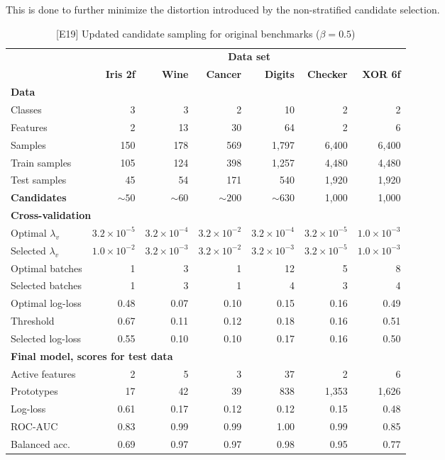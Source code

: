 This is done to further minimize the distortion introduced by the non-stratified candidate selection.\par
%
\begin{table}
\caption{[E19] Updated candidate sampling for original benchmarks ($\beta=0.5$)}
\label{tab_e19}
%
\begin{center}
\small
\begin{tabular}{|lrrrrrr|}
\hline
&\multicolumn{6}{c|}{\textbf{\hrulefill\ Data set \hrulefill}}\\
&\textbf{Iris 2f}&\textbf{Wine}&\textbf{Cancer}&\textbf{Digits}&\textbf{Checker}&\textbf{XOR 6f}\\
\multicolumn{7}{|l|}{\textbf{Data}}\\
Classes&3&3&2&10&2&2\\
Features&2&13&30&64&2&6\\
Samples&150&178&569&1,797&6,400&6,400\\
Train samples&105&124&398&1,257&4,480&4,480\\
Test samples&45&54&171&540&1,920&1,920\\
\textbf{Candidates}&$\sim50$&$\sim60$&$\sim200$&$\sim630$&1,000&1,000\\
\multicolumn{7}{|l|}{\textbf{Cross-validation}}\\
Optimal $\lambda_v$&$3.2\times10^{-5}$&$3.2\times10^{-4}$&$3.2\times10^{-2}$&$3.2\times10^{-4}$&$3.2\times10^{-5}$&$1.0\times10^{-3}$\\
Selected $\lambda_v$&$1.0\times10^{-2}$&$3.2\times10^{-3}$&$3.2\times10^{-2}$&$3.2\times10^{-3}$&$3.2\times10^{-5}$&$1.0\times10^{-3}$\\
Optimal batches&1&3&1&12&5&8\\
Selected batches&1&3&1&4&3&4\\
Optimal log-loss&0.48&0.07&0.10&0.15&0.16&0.49\\
Threshold&0.67&0.11&0.12&0.18&0.16&0.51\\
Selected log-loss&0.55&0.10&0.10&0.17&0.16&0.50\\
\multicolumn{7}{|l|}{\textbf{Final model, scores for test data}}\\
Active features&2&5&3&37&2&6\\
Prototypes&17&42&39&838&1,353&1,626\\
Log-loss&0.61&0.17&0.12&0.12&0.15&0.48\\
ROC-AUC&0.83&0.99&0.99&1.00&0.99&0.85\\
Balanced acc.&0.69&0.97&0.97&0.98&0.95&0.77\\
\hline
\end{tabular}
\end{center}
\end{table}
